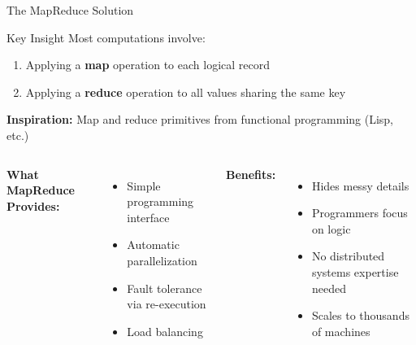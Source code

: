 \documentclass[aspectratio=169]{beamer}
\begin{document}
\begin{frame}{The MapReduce Solution}
\begin{block}{Key Insight}
Most computations involve:
\begin{enumerate}
    \item Applying a \textbf{map} operation to each logical record
    \item Applying a \textbf{reduce} operation to all values sharing the same key
\end{enumerate}
\end{block}

\vspace{0.3cm}

\textbf{Inspiration:} Map and reduce primitives from functional programming (Lisp, etc.)

\vspace{0.3cm}

\begin{columns}
\textbf{What MapReduce Provides:}
\begin{itemize}
    \item Simple programming interface
    \item Automatic parallelization
    \item Fault tolerance via re-execution
    \item Load balancing
\end{itemize}

\textbf{Benefits:}
\begin{itemize}
    \item Hides messy details
    \item Programmers focus on logic
    \item No distributed systems expertise needed
    \item Scales to thousands of machines
\end{itemize}
\end{columns}
\end{frame}
\end{document}
